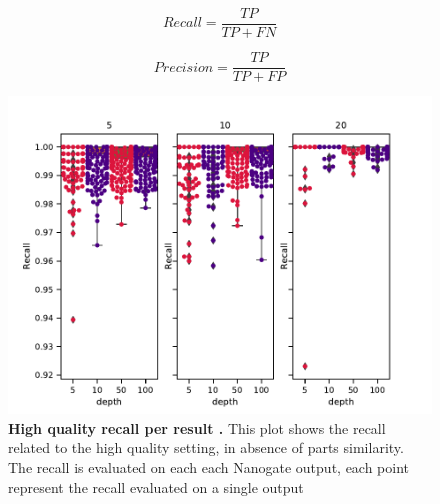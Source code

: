\documentclass[11pt, a4paper]{article}
\begin{document}
\begin{equation}
    Recall = \frac{TP}{TP + FN}
\end{equation}

      
\begin{equation}
    Precision = \frac{TP}{TP + FP}
\end{equation}


 \begin{figure}[ht]
    \begin{center}
    \includegraphics[width=1.35\textwidth]{../results/images_notebook/v_460/hq_sim_00_recall_per_result.pdf}
    \end{center}
    \caption{{\bf High quality recall per result .}  This plot shows the recall related to the high quality setting, in absence of parts similarity. The recall is evaluated on each each Nanogate output, each point represent the recall evaluated on a single output}
   \label{fig:v_460_hq_sim_00_recall_per_result}
\end{figure}
\end{document}
